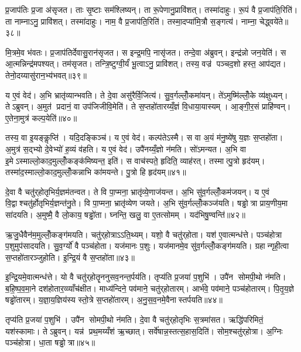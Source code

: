 प्र॒जाप॑तिः प्र॒जा अ॑सृजत। ताः सृ॒ष्टाः सम॑श्लिष्यन्। ता रू॒पेणानु॒प्रावि॑शत्। तस्मा॑दाहुः। रू॒पं वै प्र॒जाप॑ति॒रिति॑। ता नाम्नाऽनु॒ प्रावि॑शत्। तस्मा॑दाहुः। नाम॒ वै प्र॒जाप॑ति॒रिति॑। तस्मा॒दप्या॑मि॒त्रौ स॒ङ्गत्य॑। नाम्ना॒ चेद्ध्वये॑ते॥३८॥

मि॒त्रमे॒व भ॑वतः। प्र॒जाप॑तिर्देवासु॒रान॑सृजत। स इन्द्र॒मपि॒ नासृ॑जत। तन्दे॒वा अ॑ब्रुवन्। इन्द्र॑न्नो जन॒येति॑। स आ॒त्मन्निन्द्र॑मपश्यत्। तम॑सृजत। तन्त्रि॒ष्टुग्वी॒र्यं॑ भू॒त्वाऽनु॒ प्रावि॑शत्। तस्य॒ वज्र॑ पञ्चद॒शो हस्त॒ आप॑द्यत। तेनो॒दय्यासु॑रान॒भ्य॑भवत्॥३९॥

य ए॒वं वेद॑। अ॒भि भ्रातृ॑व्यान्भवति। ते दे॒वा असु॑रैर्वि॒जित्य॑। सु॒व॒र्गल्लोँ॒कमा॑यन्। ते॑ऽमुष्मि॑ल्लोँ॒के व्य॑क्षुध्यन्। तेऽब्रुवन्। अ॒मुत॑ प्रदानं॒ वा उप॑जिजीवि॒मेति॑। ते स॒प्तहो॑तारय्यँ॒ज्ञं वि॒धाया॒यास्यम्। आ॒ङ्गी॒र॒सं प्राहि॑ण्वन्। ए॒तेना॒मुत्र॑ कल्प॒येति॑॥४०॥

तस्य॒ वा इ॒यङ्कॢप्ति॑। यदि॒दङ्किञ्च॑। य ए॒वं वेद॑। कल्प॑तेऽस्मै। स वा अ॒यं म॑नु॒ष्ये॑षु य॒ज्ञः स॒प्तहो॑ता। अ॒मुत्र॑ स॒द्भ्यो दे॒वेभ्यो॑ ह॒व्यं व॑हति। य ए॒वं वेद॑। उपै॑नय्यँ॒ज्ञो न॑मति। सो॑ऽमन्यत। अ॒भि वा इ॒मेऽस्माल्लो॒काद॒मुल्लोँ॒कङ्क॑मिष्यन्त॒ इति॑। स वाच॑स्पते॒ हृदिति॒ व्याह॑रत्। तस्मात्पु॒त्रो हृद॑यम्। तस्मा॑द॒स्माल्लो॒काद॒मुल्लोँ॒कन्नाभि का॑मयन्ते। पु॒त्रो हि हृद॑यम्॥४१॥\anuvakamend[ह्वये॑ते अभवत्कल्प॒येतीति॑ च॒त्वारि॑ च]

दे॒वा वै चतु॑र्‌होतृभिर्य॒ज्ञम॑तन्वत। ते वि पा॒प्मना॒ भ्रातृ॑व्ये॒णाज॑यन्त। अ॒भि सु॑व॒र्गल्लोँ॒कम॑जयन्। य ए॒वं वि॒द्वाश्चतु॑र्होतृभिर्य॒ज्ञन्त॑नु॒ते। वि पा॒प्मना॒ भ्रातृ॑व्येण जयते। अ॒भि सु॑व॒र्गल्लोँ॒कञ्ज॑यति। षड्ढोत्रा प्राय॒णीय॒मा सा॑दयति। अ॒मुष्मै॒ वै लो॒काय॒ षड्ढो॑ता। घ्नन्ति॒ खलु॒ वा ए॒तत्सोमम्। यद॑भिषु॒ण्वन्ति॑॥४२॥

ऋ॒जु॒धैवैन॑म॒मुल्लोँ॒कङ्ग॑मयति। चतु॑र्‌होत्राऽऽति॒थ्यम्। यशो॒ वै चतु॑र्‌होता। यश॑ ए॒वात्मन्ध॑त्ते। पञ्च॑होत्रा प॒शुमुप॑सादयति। सु॒व॒र्ग्यो॑ वै पञ्च॑होता। यज॑मानः प॒शुः। यज॑मानमे॒व सु॑व॒र्गल्लोँ॒कङ्ग॑मयति। ग्रहान्गृही॒त्वा स॒प्तहो॑तारञ्जुहोति। इ॒न्द्रि॒यं वै स॒प्तहो॑ता॥४३॥

इ॒न्द्रि॒यमे॒वात्मन्ध॑त्ते। यो वै चतु॑र्‌होतॄननुसव॒नन्त॒र्पय॑ति। तृप्य॑ति प्र॒जया॑ प॒शुभि॑। उपै॑न सोमपी॒थो न॑मति। ब॒हि॒ष्प॒व॒मा॒ने दश॑होतार॒व्व्याँच॑क्षीत। माध्य॑न्दिने॒ पव॑माने॒ चतु॑र्‌होतारम्। आर्भ॑वे॒ पव॑माने॒ पञ्च॑होतारम्। पि॒तृ॒य॒ज्ञे षड्ढो॑तारम्। य॒ज्ञा॒य॒ज्ञिय॑स्य स्तो॒त्रे स॒प्तहो॑तारम्। अ॒नु॒स॒व॒नमे॒वैनास्तर्पयति॥४४॥

तृप्य॑ति प्र॒जया॑ प॒शुभि॑। उपै॑न सोमपी॒थो न॑मति। दे॒वा वै चतु॑र्‌होतृभिः स॒त्रमा॑सत। ऋद्धि॑परिमितं॒ यश॑स्कामाः। तेऽब्रुवन्। यन्न॑ प्रथ॒मय्यँश॑ ऋ॒च्छात्। सर्वे॑षान्न॒स्तत्स॒हास॒दिति॑। सोम॒श्चतु॑र्‌होत्रा। अ॒ग्निः पञ्च॑होत्रा। धा॒ता षड्ढोत्रा॥४५॥

